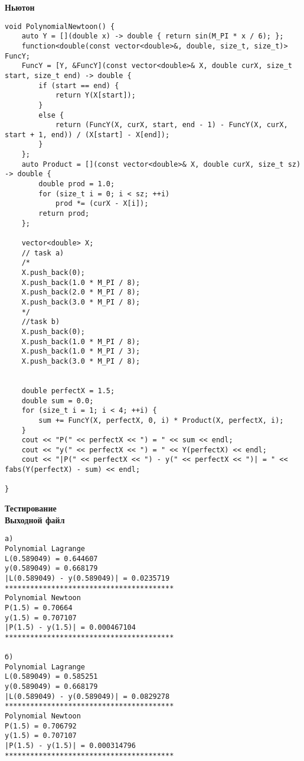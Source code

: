\textbf{Ньютон}
\begin{lstlisting}
void PolynomialNewtoon() {
	auto Y = [](double x) -> double { return sin(M_PI * x / 6); };
	function<double(const vector<double>&, double, size_t, size_t)> FuncY; 
	FuncY = [Y, &FuncY](const vector<double>& X, double curX, size_t start, size_t end) -> double {
		if (start == end) {
			return Y(X[start]);
		}
		else {
			return (FuncY(X, curX, start, end - 1) - FuncY(X, curX, start + 1, end)) / (X[start] - X[end]);
		}
	};
	auto Product = [](const vector<double>& X, double curX, size_t sz) -> double {
		double prod = 1.0;
		for (size_t i = 0; i < sz; ++i)
			prod *= (curX - X[i]);
		return prod;
	};

	vector<double> X;
	// task a)
	/*
	X.push_back(0);
	X.push_back(1.0 * M_PI / 8);
	X.push_back(2.0 * M_PI / 8);
	X.push_back(3.0 * M_PI / 8);
	*/
	//task b)
	X.push_back(0);
	X.push_back(1.0 * M_PI / 8);
	X.push_back(1.0 * M_PI / 3);
	X.push_back(3.0 * M_PI / 8);
	

	double perfectX = 1.5;
	double sum = 0.0;
	for (size_t i = 1; i < 4; ++i) {
		sum += FuncY(X, perfectX, 0, i) * Product(X, perfectX, i);
	}
	cout << "P(" << perfectX << ") = " << sum << endl;
	cout << "y(" << perfectX << ") = " << Y(perfectX) << endl;
	cout << "|P(" << perfectX << ") - y(" << perfectX << ")| = " << fabs(Y(perfectX) - sum) << endl;

}
\end{lstlisting}
\vspace{0.5cm}

\textbf{Тестирование}\\


\textbf{Выходной файл}
\begin{verbatim}
а)
Polynomial Lagrange
L(0.589049) = 0.644607
y(0.589049) = 0.668179
|L(0.589049) - y(0.589049)| = 0.0235719
****************************************
Polynomial Newtoon
P(1.5) = 0.70664
y(1.5) = 0.707107
|P(1.5) - y(1.5)| = 0.000467104
****************************************

б)
Polynomial Lagrange
L(0.589049) = 0.585251
y(0.589049) = 0.668179
|L(0.589049) - y(0.589049)| = 0.0829278
****************************************
Polynomial Newtoon
P(1.5) = 0.706792
y(1.5) = 0.707107
|P(1.5) - y(1.5)| = 0.000314796
****************************************
\end{verbatim}


\pagebreak
